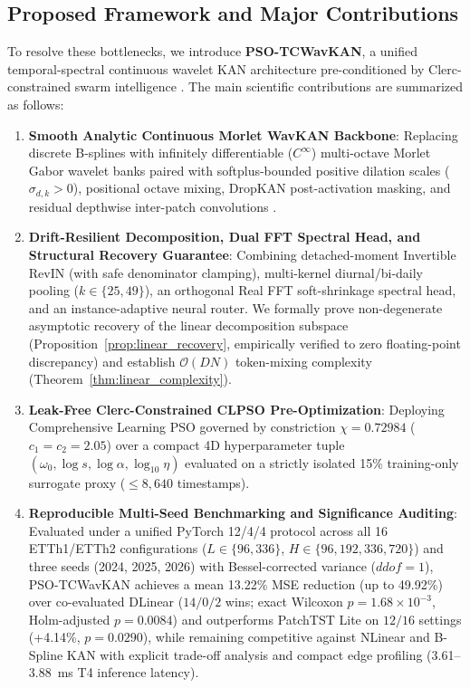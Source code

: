 \documentclass[pdflatex,sn-mathphys-num,referee,lineno]{sn-jnl}
\theoremstyle{thmstyleone}
\theoremstyle{thmstyletwo}
\theoremstyle{thmstylethree}
\begin{document}
\subsection{Proposed Framework and Major Contributions}\label{subsec:contributions}
To resolve these bottlenecks, we introduce \textbf{PSO-TCWavKAN}, a unified temporal-spectral continuous wavelet KAN architecture pre-conditioned by Clerc-constrained swarm intelligence \cite{clerc2002constriction, liang2006clpso}. The main scientific contributions are summarized as follows:
\begin{enumerate}
    \item \textbf{Smooth Analytic Continuous Morlet WavKAN Backbone}: Replacing discrete B-splines with infinitely differentiable ($C^\infty$) multi-octave Morlet Gabor wavelet banks \cite{grossmann1984decomposition, bozorgasl2024wavkan} paired with softplus-bounded positive dilation scales ($\sigma_{d,k} > 0$), positional octave mixing, DropKAN \cite{altarabichi2024dropkan} post-activation masking, and residual depthwise inter-patch convolutions \cite{he2016resnet}.
    \item \textbf{Drift-Resilient Decomposition, Dual FFT Spectral Head, and Structural Recovery Guarantee}: Combining detached-moment Invertible RevIN (with safe denominator clamping), multi-kernel diurnal/bi-daily pooling ($k \in \{25, 49\}$), an orthogonal Real FFT soft-shrinkage spectral head, and an instance-adaptive neural router. We formally prove non-degenerate asymptotic recovery of the linear decomposition subspace (Proposition~\ref{prop:linear_recovery}, empirically verified to zero floating-point discrepancy) and establish $\mathcal{O}(DN)$ token-mixing complexity (Theorem~\ref{thm:linear_complexity}).
    \item \textbf{Leak-Free Clerc-Constrained CLPSO Pre-Optimization}: Deploying Comprehensive Learning PSO \cite{liang2006clpso} governed by constriction $\chi = 0.72984$ ($c_1 = c_2 = 2.05$) \cite{clerc2002constriction} over a compact 4D hyperparameter tuple $(\omega_0, \log s, \log\alpha, \log_{10}\eta)$ evaluated on a strictly isolated 15\% training-only surrogate proxy ($\le 8,640$ timestamps).
    \item \textbf{Reproducible Multi-Seed Benchmarking and Significance Auditing}: Evaluated under a unified PyTorch \cite{paszke2019pytorch} 12/4/4 protocol across all 16 ETTh1/ETTh2 configurations ($L \in \{96, 336\}$, $H \in \{96, 192, 336, 720\}$) and three seeds (2024, 2025, 2026) with Bessel-corrected variance ($ddof=1$), PSO-TCWavKAN achieves a mean 13.22\% MSE reduction (up to 49.92\%) over co-evaluated DLinear ($14/0/2$ wins; exact Wilcoxon $p = 1.68 \times 10^{-3}$, Holm-adjusted $p = 0.0084$) and outperforms PatchTST Lite on $12/16$ settings (+4.14\%, $p = 0.0290$), while remaining competitive against NLinear and B-Spline KAN with explicit trade-off analysis and compact edge profiling (3.61--3.88~ms T4 inference latency).
\end{enumerate}
\end{document}
